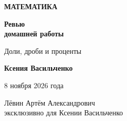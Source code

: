 \documentclass[a4paper,12pt]{article}
\begin{document}
\thispagestyle{empty}
\begin{titlepage}
\centering
\vspace*{38mm}
{\small\color{accent}\bfseries МАТЕМАТИКА}\par
\vspace{13mm}
{\Huge\bfseries\color{darkaccent} Ревью\\[3mm] домашней работы}\par
\vspace{10mm}
{\large Доли, дроби и проценты}\par
\vspace{22mm}
{\Large\bfseries Ксения Васильченко}\par
\vspace{8mm}
{\normalsize 8 ноября 2026 года}\par
\vfill
{\footnotesize\color{textgray} Лёвин Артём Александрович\\[2mm]
эксклюзивно для Ксении Васильченко}\par
\vspace{9mm}
\vspace*{8mm}
\end{titlepage}
\setcounter{page}{2}
\end{document}
